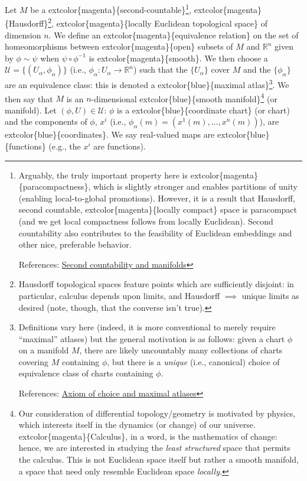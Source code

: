 \documentclass[
]{book}
\begin{document}
Let \(M\) be a extcolor\{magenta\}\{second-countable\}\footnote{Arguably, the truly important property here is extcolor\{magenta\}\{paracompactness\}, which is slightly stronger and enables partitions of unity (enabling local-to-global promotions).
  However, it is a result that Hausdorff, second countable, extcolor\{magenta\}\{locally compact\} space is paracompact (and we get local compactness follows from locally Euclidean).
  Second countability also contributes to the feasibility of Euclidean embeddings and other nice, preferable behavior.

  References: \href{https://math.stackexchange.com/questions/2131530/why-is-important-for-a-manifold-to-have-countable-basis}{Second countability and manifolds}}, extcolor\{magenta\}\{Hausdorff\}\footnote{Hausdorff topological spaces feature points which are sufficiently disjoint: in particular, calculus depends upon limits, and Hausdorff \(\implies\) unique limits as desired (note, though, that the converse isn't true).}, extcolor\{magenta\}\{locally Euclidean topological space\} of dimension \(n\).
We define an extcolor\{magenta\}\{equivalence relation\} on the set of homeomorphisms between extcolor\{magenta\}\{open\} subsets of \(M\) and \(\mathbb{R}^n\) given by \(\phi \sim \psi\) when \(\psi \circ \phi^{-1}\) is extcolor\{magenta\}\{smooth\}.
We then choose a \(\mathcal{U} = \{(U_\alpha, \phi_\alpha)\}\) (i.e., \(\phi_\alpha : U_\alpha \to \mathbb{R}^n\)) such that the \(\{U_\alpha\}\) cover \(M\) and the \(\{\phi_\alpha\}\) are an equivalence class: this is denoted a extcolor\{blue\}\{maximal atlas\}\footnote{Definitions vary here (indeed, it is more conventional to merely require ``maximal'' atlases) but the general motivation is as follows: given a chart \(\phi\) on a manifold \(M\), there are likely uncountably many collections of charts covering \(M\) containing \(\phi\), but there is a \emph{unique} (i.e., canonical) choice of equivalence class of charts containing \(\phi\).

  References: \href{https://math.stackexchange.com/questions/66554/is-zorns-lemma-required-to-prove-the-existence-of-a-maximal-atlas-on-a-manifold}{Axiom of choice and maximal atlases}}.
We then say that \(M\) is an \(n\)-dimensional extcolor\{blue\}\{smooth manifold\}\footnote{Our consideration of differential topology/geometry is motivated by physics, which interests itself in the dynamics (or change) of our universe. extcolor\{magenta\}\{Calculus\}, in a word, is the mathematics of change: hence, we are interested in studying the \emph{least structured} space that permits the calculus.
  This is not Euclidean space itself but rather a smooth manifold, a space that need only resemble Euclidean space \emph{locally}.} (or manifold).
Let \((\phi, U) \in \mathcal{U}\): \(\phi\) is a extcolor\{blue\}\{coordinate chart\} (or chart) and the components of \(\phi\), \(x^i\) (i.e., \(\phi_\alpha(m) = (x^1(m), \dots, x^n(m))\)), are extcolor\{blue\}\{coordinates\}.
We say real-valued maps are extcolor\{blue\}\{functions\} (e.g., the \(x^i\) are functions).
\end{document}
